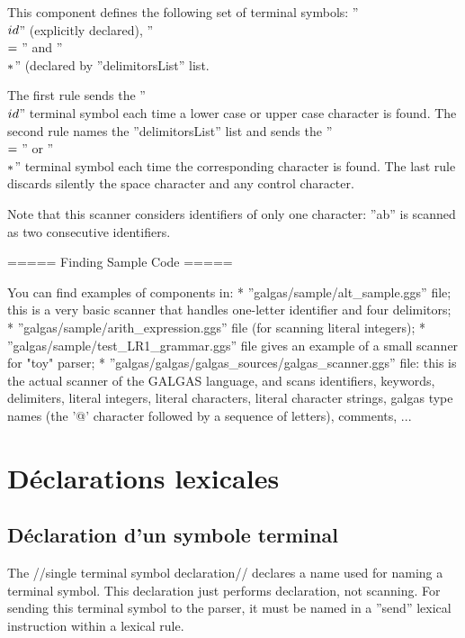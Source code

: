 {This  component defines the following set of terminal symbols: ''\\$id\\$'' (explicitly declared), ''\\$=\\$'' and ''\\$*\\$'' (declared  by ''delimitorsList'' list.

The first rule sends the ''\\$id\\$'' terminal symbol each time a lower case or upper case character is found. The second rule names the ''delimitorsList'' list and sends the ''\\$=\\$'' or ''\\$*\\$'' terminal symbol each time the corresponding character is found. The last rule discards silently the space character and any control character.

Note that this scanner considers identifiers of only one character: ''ab'' is scanned as two consecutive identifiers.

===== Finding Sample Code =====

You can find examples of  components in:
  * ''galgas/sample/alt\_sample.ggs'' file; this is a very basic scanner that handles one-letter identifier and four delimitors;
  * ''galgas/sample/arith\_expression.ggs'' file (for scanning literal integers); 
  * ''galgas/sample/test\_LR1\_grammar.ggs'' file gives an example of a small scanner for "toy" parser;
  * ''galgas/galgas/galgas\_sources/galgas\_scanner.ggs'' file: this is the actual scanner of the GALGAS language, and scans identifiers, keywords, delimiters, literal integers, literal characters, literal character strings, galgas type names (the '@' character followed by a sequence of letters), comments, ...   

\section{Déclarations lexicales}

\subsection{Déclaration d'un symbole terminal}

The //single terminal symbol declaration// declares a name used for naming a terminal symbol. This declaration just performs declaration, not scanning. For sending this terminal symbol to the parser, it must be named in a ''send'' lexical instruction within a lexical rule.

}
